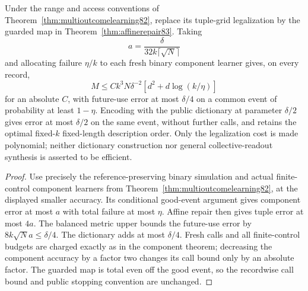 \begin{corollary}
\label{cor:affinelearner83}
Under the range and access conventions of
Theorem~\ref{thm:multioutcomelearning82}, replace its tuple-grid
legalization by the guarded map in Theorem~\ref{thm:affinerepair83}.
Taking
\[
 a=\frac{\delta}{32k\lceil\sqrt N\rceil}
\]
and allocating failure $\eta/k$ to each fresh binary component
learner gives, on every record,
\[
 M\le Ck^3N\delta^{-2}[d^2+d\log(k/\eta)]
\]
for an absolute $C$, with future-use error at most $\delta/4$ on a
common event of probability at least $1-\eta$.
Encoding with the public dictionary at parameter $\delta/2$ gives
error at most $\delta/2$ on the same event, without further calls,
and retains the optimal fixed-$k$ fixed-length description order.
Only the legalization cost is made polynomial; neither dictionary
construction nor general collective-readout synthesis is asserted
to be efficient.
\end{corollary}
\begin{proof}
Use precisely the reference-preserving binary simulation and actual
finite-control component learners from
Theorem~\ref{thm:multioutcomelearning82}, at the displayed smaller
accuracy.  Its conditional good-event argument gives component
error at most $a$ with total failure at most $\eta$.  Affine repair
then gives tuple error at most $4a$.  The balanced metric upper
bounds the future-use error by
$8k\sqrt N a\le\delta/4$.  The dictionary adds at most $\delta/4$.
Fresh calls and all finite-control budgets are charged exactly as in
the component theorem; decreasing the component accuracy by a factor
two changes its call bound only by an absolute factor.  The guarded
map is total even off the good event, so the recordwise call bound
and public stopping convention are unchanged.
\end{proof}
